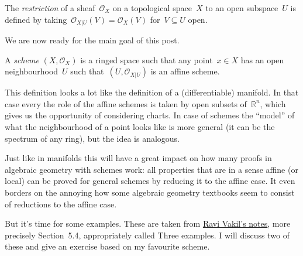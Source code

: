 \begin{definition}
  The \emph{restriction} of a sheaf~$\mathcal{O}_X$ on a topological space~$X$ to an open subspace~$U$ is defined by taking~$\mathcal{O}_{X|U}(V)=\mathcal{O}_X(V)$ for~$V\subseteq U$ open.
\end{definition}

We are now ready for the main goal of this post.

\begin{definition}
  A \emph{scheme} $(X,\mathcal{O}_X)$ is a ringed space such that any point~$x\in X$ has an open neighbourhood~$U$ such that~$(U,\mathcal{O}_{X|U})$ is an affine scheme.
\end{definition}
This definition looks a lot like the definition of a (differentiable) manifold. In that case every the role of the affine schemes is taken by open subsets of~$\mathbb{R}^n$, which gives us the opportunity of considering charts. In case of schemes the ``model'' of what the neighbourhood of a point looks like is more general (it can be the spectrum of any ring), but the idea is analogous.

Just like in manifolds this will have a great impact on how many proofs in algebraic geometry with schemes work: all properties that are in a sense affine (or local) can be proved for general schemes by reducing it to the affine case. It even borders on the annoying how some algebraic geometry textbooks seem to consist of reductions to the affine case.

But it's time for some examples. These are taken from \iftex\cite{foag}\fi\ifblog\href{http://math216.wordpress.com}{Ravi Vakil's notes}\fi, more precisely Section~5.4, appropriately called Three examples. I will discuss two of these and give an exercise based on my favourite scheme.


